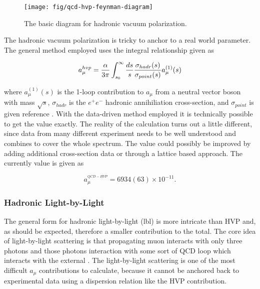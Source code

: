 \begin{figure}
\label{fig:qcd-hvp-feynman-diagram}
\texttt{[image: fig/qcd-hvp-feynman-diagram]}
\caption{The basic diagram for hadronic vacuum polarization.}
\end{figure}

The hadronic vacuum polarization is tricky to anchor to a real world parameter.  The general method employed uses the integral relationship given as

\begin{equation}
\label{eqn:qcd-hvp-integral}
a_\mu^{hvp} = \frac{\alpha}{3\pi} \int_{s_0}^{\infty} \frac{ds}{s} \\
\frac{\sigma_{hadr}(s)}{\sigma_{point}(s)} a_\mu^{(1)}(s)
\end{equation}

\noindent
where $a_\mu^{(1)}(s)$ is the 1-loop contribution to $a_\mu$ from a neutral vector boson with mass $\sqrt{s}$, $\sigma_{hadr}$ is the $e^+e^-$ hadronic annihiliation cross-section, and $\sigma_{point}$ is given reference \cite{amm-of-muon}.  With the data-driven method employed it is technically possible to get the value exactly.  The reality of the calculation turns out a little different, since data from many different experiment needs to be well understood and combines to cover the whole spectrum.  The value could possibly be improved by adding additional cross-section data or through a lattice based approach.  The currently value is given as

\begin{equation}
\label{eqn:qcd-hvp-total}
a_\mu^{^{QCD-HVP}} = 6934(63) \times 10^{-11}.
\end{equation}

\subsubsection{Hadronic Light-by-Light}

The general form for hadronic light-by-light (lbl) is more intricate than HVP and, as should be expected, therefore a smaller contribution to the total.  The core idea of light-by-light scattering is that propagating muon interacts with only three photons and those photons interaction with some sort of QCD loop which interacts with the external .  The light-by-light scattering is one of the most difficult $a_\mu$ contributions to calculate, because it cannot be anchored back to experimental data using a dispersion relation like the HVP contribution.

